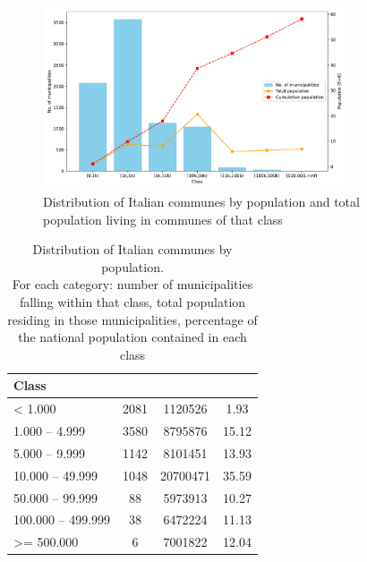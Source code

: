 \begin{figure}[tbp]
	\centering
	\includegraphics[width=0.8\textwidth]{img/numOfComm_by_class_v2.pdf}
	\caption{Distribution of Italian communes by population and total population living in communes of that class}
	\label{fig:comm_by_class}
\end{figure}


\begin{table}[tbp]
	\centering
\begin{tabular}{l S[table-format=4.0] S[table-format=8.0] S[table-alignment-mode = marker]}
	\toprule
	Class &  &  & \\
	\midrule
	< 1.000 & 2081 & 1120526 & 1.93\\
	1.000 – 4.999 & 3580 & 8795876 & 15.12\\
	5.000 – 9.999 & 1142 & 8101451 & 13.93\\
	10.000 – 49.999 & 1048 & 20700471 & 35.59\\
	50.000 – 99.999 & 88 & 5973913 & 10.27\\
	100.000 – 499.999 & 38 & 6472224 & 11.13\\
	>= 500.000 & 6 & 7001822 & 12.04\\
	\bottomrule
\end{tabular}
	\caption{Distribution of Italian communes by population.\\
		For each category:
		number of municipalities falling within that class,
		total population residing in those municipalities,
		percentage of the national population contained in each class}
	\label{tab:comm_by_class}
\end{table}

